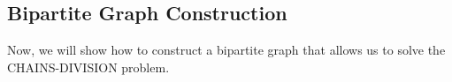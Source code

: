 \begin{comment}
\subsection{Reduction idea}
The intuition behind the reduction is the following: given a tree $T$ and the number of chains $p$, we can construct a bipartite graph $G = (V, E)$ in which a perfect matching (\cref{def:matching}) always exists. In turn, a perfect matching with minimum weight enables us to retrieve the optimal partition of the nodes in $T$ into $p$ chains, such that the run-length encoding of each chain is minimized.

In the following sections we will show how to construct the bipartite graph $G$ and proof that $G$ constructed as defined in \cref{def:bip_construction} always allows to find a perfect matching and the weight of the matching is the minimum run length encoding of the optimal partition of the nodes of $T$ into $p$ chains.

\alessio{Introduci il bipartite graph con troppa cattiveria :). Prima abbiamo parlato di alberi, adesso subito di grafi bipartiti. La soluzione con grafo bipartito è quella che hai voluto seguire tu, quindi dovresti introdurla più come una scelta implementativa, che come un dato di fatto. In breve, dovresti dimostrare qua che Chains-Div. si riduce al MWBGP, quindi sarebbe da girare un attimo l'ordine: Se abbiamo un grafo con un perfect matching allora possiamo ridurre il problema -> creiamo un grafo in questo modo -> contiene un perfect matching -> possiamo sempre fare la riduzione.} \davide{Ho aggiunto un paragrafo introduttivo.. può andare o intendevi proprio girare tutta la dimostrazione?}
\alessio{Se l'esistenza perfect matching è sufficiente a fare la riduzione, secondo me è meglio girare l'ordine delle dimostrazioni. Altrimenti, se per la riduzione ti servono le proprietà specifiche del grafo che hai creato allora va bene questo ordine. Pensandoci, puoi riportare questa discussione nell'intrduzione della sezione 6.2, mettendo qualcosa tipo ``In particular we show that, given a tree $T$ and the number of chains $p$, we can construct a bipartite ...'' tra i due paragrafi che ci sono già. (occhio alle frasi troppo lunghe).}
\end{comment}

\subsection{Bipartite Graph Construction}
Now, we will show how to construct a bipartite graph that allows us to solve the \textsc{CHAINS-DIVISION} problem.


